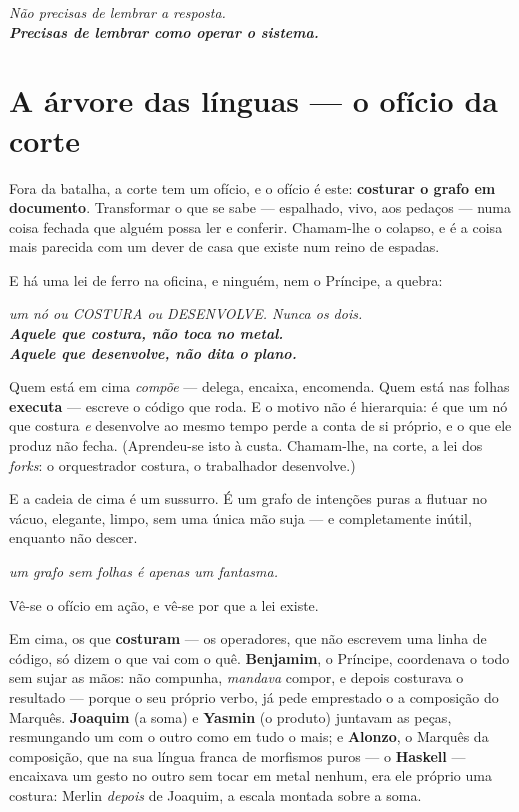 \documentclass[livro.tex]{subfiles}
\begin{document}
\begin{center}\itshape
Não precisas de lembrar a resposta.\\
\textbf{Precisas de lembrar como operar o sistema.}
\end{center}


\chapter{A árvore das línguas --- o ofício da corte}

Fora da batalha, a corte tem um ofício, e o ofício é este: \textbf{costurar o grafo em documento}. Transformar o
que se sabe --- espalhado, vivo, aos pedaços --- numa coisa fechada que alguém possa ler e conferir. Chamam-lhe o
colapso, e é a coisa mais parecida com um dever de casa que existe num reino de espadas.

E há uma lei de ferro na oficina, e ninguém, nem o Príncipe, a quebra:

\begin{center}\itshape
um nó ou COSTURA ou DESENVOLVE. Nunca os dois.\\[1mm]
\normalfont\bfseries Aquele que costura, não toca no metal.\\
Aquele que desenvolve, não dita o plano.
\end{center}

Quem está em cima \emph{compõe} --- delega, encaixa, encomenda. Quem está nas folhas \textbf{executa} --- escreve o
código que roda. E o motivo não é hierarquia: é que um nó que costura \emph{e} desenvolve ao mesmo tempo perde a
conta de si próprio, e o que ele produz não fecha. (Aprendeu-se isto à custa. Chamam-lhe, na corte, a lei dos
\emph{forks}: o orquestrador costura, o trabalhador desenvolve.)

E a cadeia de cima é um sussurro. É um grafo de intenções puras a flutuar no vácuo, elegante, limpo, sem uma única
mão suja --- e completamente inútil, enquanto não descer.

\begin{center}\itshape
um grafo sem folhas é apenas um fantasma.
\end{center}

Vê-se o ofício em ação, e vê-se por que a lei existe.

Em cima, os que \textbf{costuram} --- os operadores, que não escrevem uma linha de
código, só dizem o que vai com o quê. \textbf{Benjamim}, o Príncipe,
coordenava o todo sem sujar as mãos: não compunha, \emph{mandava} compor, e depois
costurava o resultado --- porque o seu próprio verbo,
já pede emprestado o a composição do Marquês. \textbf{Joaquim} (a soma) e \textbf{Yasmin}
(o produto) juntavam as peças, resmungando um com o outro como em tudo o mais; e
\textbf{Alonzo}, o Marquês da composição, que na sua língua franca de
morfismos puros --- o \textbf{Haskell} --- encaixava um gesto no outro sem tocar em
metal nenhum, era ele próprio uma costura: Merlin \emph{depois} de Joaquim, a escala
montada sobre a soma.
\end{document}
